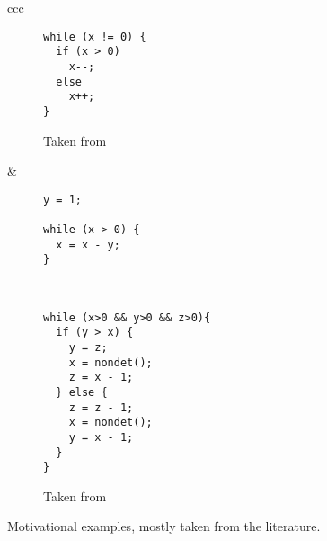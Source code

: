 \documentclass[a4paper]{llncs}
\begin{document}
\begin{figure*}[p]
\begin{tabular}{ccc}
\begin{subfigure}[b]{0.45\textwidth}
\begin{lstlisting}
while (x != 0) {
  if (x > 0)
    x--;
  else
    x++;
}
\end{lstlisting}
\caption{Taken from \cite{DBLP:conf/tacas/CookSZ13}}
 \label{fig:motivation.g}
\end{subfigure} 


&

\begin{subfigure}[b]{0.45\textwidth}
\begin{lstlisting}
y = 1;

while (x > 0) {
  x = x - y;
}
\end{lstlisting}
\caption{}
 \label{fig:motivation.h}
\end{subfigure} \\
\hline

\begin{subfigure}[b]{0.45\textwidth}
\begin{lstlisting}
while (x>0 && y>0 && z>0){
  if (y > x) {
    y = z;
    x = nondet();
    z = x - 1;
  } else {
    z = z - 1;
    x = nondet();
    y = x - 1;
  }
}
\end{lstlisting}
\caption{Taken from~\cite{BA:mcs}}
 \label{fig:motivation.i}
\end{subfigure} 
\end{tabular}
\caption{Motivational examples, mostly taken from the literature.\label{fig:motivation}}
\end{figure*}
\end{document}
